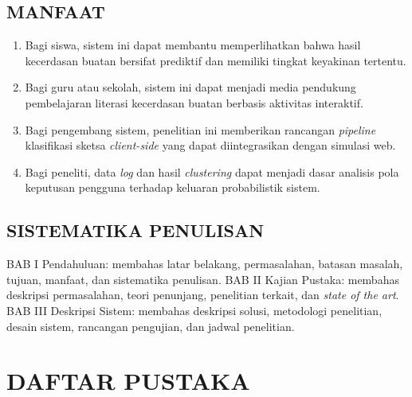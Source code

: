 \documentclass[12pt,a4paper,oneside,openany]{report}
\begin{document}
\section{MANFAAT}
\label{sec:manfaat}

\begin{enumerate}
    \item Bagi siswa, sistem ini dapat membantu memperlihatkan bahwa hasil kecerdasan buatan bersifat prediktif dan memiliki tingkat keyakinan tertentu.
    \item Bagi guru atau sekolah, sistem ini dapat menjadi media pendukung pembelajaran literasi kecerdasan buatan berbasis aktivitas interaktif.
    \item Bagi pengembang sistem, penelitian ini memberikan rancangan \textit{pipeline} klasifikasi sketsa \textit{client-side} yang dapat diintegrasikan dengan simulasi web.
    \item Bagi peneliti, data \textit{log} dan hasil \textit{clustering} dapat menjadi dasar analisis pola keputusan pengguna terhadap keluaran probabilistik sistem.
\end{enumerate}

\section{SISTEMATIKA PENULISAN}
\label{sec:sistematika-penulisan}

BAB I Pendahuluan: membahas latar belakang, permasalahan, batasan masalah, tujuan, manfaat, dan sistematika penulisan. BAB II Kajian Pustaka: membahas deskripsi permasalahan, teori penunjang, penelitian terkait, dan \textit{state of the art}. BAB III Deskripsi Sistem: membahas deskripsi solusi, metodologi penelitian, desain sistem, rancangan pengujian, dan jadwal penelitian.

\chapter*{DAFTAR PUSTAKA}
\end{document}
